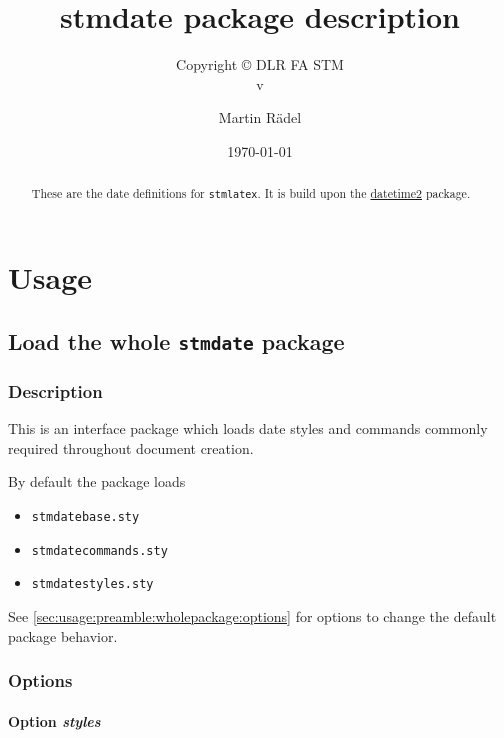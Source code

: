 \documentclass[%
  type=article,%
  layout=koma,%
  date=false,%
  hyperref=true,%
  listings=true%
]{stmtext}
\author{Martin R\"{a}del}
\title{stmdate package description}
\subtitle{Copyright \copyright{} \the\year{} DLR FA STM\\v\formatdate[versiondatestyle]{\DTMToday}}
\date{\today}
\begin{document}
\maketitle

\begin{abstract}
These are the date definitions for \texttt{stmlatex}. It is build upon the \href{https://ctan.org/pkg/datetime2}{datetime2} package.
\end{abstract}

\tableofcontents

\section{Usage}%

\subsection{Load the whole \protect\texttt{stmdate} package}
\label{sec:usage:preamble:wholepackage}

\subsubsection{Description}
\label{sec:usage:preamble:wholepackage:description}

This is an interface package which loads date styles and commands commonly required throughout document creation.

By default the package loads

\begin{itemize}[noitemsep]
  \item \verb+stmdatebase.sty+
  \item \verb+stmdatecommands.sty+
  \item \verb+stmdatestyles.sty+
\end{itemize}

See \autoref{sec:usage:preamble:wholepackage:options} for options to change the default package behavior.

\subsubsection{Options}
\label{sec:usage:preamble:wholepackage:options}

\paragraph{Option \protect\textit{styles}} 
\label{sec:usage:preamble:wholepackage:options:styles}
\end{document}
